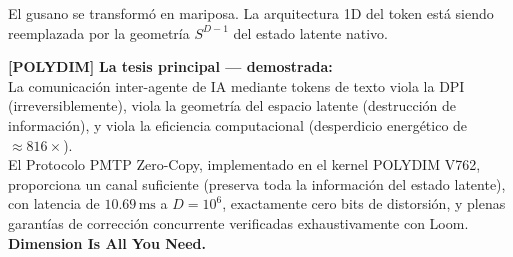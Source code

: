 El gusano se transformó en mariposa. La arquitectura 1D del token está siendo
reemplazada por la geometría $S^{D-1}$ del estado latente nativo.

\textbf{[POLYDIM]} 
\textbf{La tesis principal --- demostrada:}\\[0.5cm]
La comunicación inter-agente de IA mediante tokens de texto viola la DPI
(irreversiblemente), viola la geometría del espacio latente (destrucción de información),
y viola la eficiencia computacional (desperdicio energético de $\approx 816\times$).\\[0.3cm]
El Protocolo PMTP Zero-Copy, implementado en el kernel POLYDIM V762,
proporciona un canal suficiente (preserva toda la información del estado latente),
con latencia de $10.69\,\text{ms}$ a $D=10^6$, exactamente cero bits de distorsión,
y plenas garantías de corrección concurrente verificadas exhaustivamente con Loom.\\[0.3cm]
\textbf{Dimension Is All You Need.}

